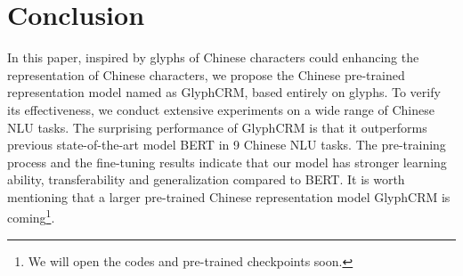 \section{Conclusion}

In this paper, inspired by glyphs of Chinese characters could enhancing the representation of Chinese characters, we propose the Chinese pre-trained representation model named as GlyphCRM, based entirely on glyphs. To verify its effectiveness, we conduct extensive experiments on a wide range of Chinese NLU tasks. The surprising performance of GlyphCRM is that it outperforms previous state-of-the-art model BERT in 9 Chinese NLU tasks. The pre-training process and the fine-tuning results indicate that our model has stronger learning ability, transferability and generalization compared to BERT. It is worth mentioning that a larger pre-trained Chinese representation model GlyphCRM is coming\footnote{We will open the codes and pre-trained checkpoints soon.}.